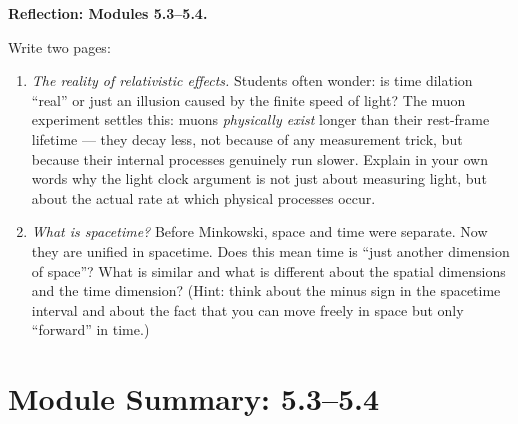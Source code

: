 \documentclass[12pt, a4paper, twoside]{book}
\begin{document}
\begin{reflectionbox}
\textbf{Reflection: Modules 5.3--5.4.}

Write two pages:

\begin{enumerate}[leftmargin=2em,itemsep=6pt]
  \item \textit{The reality of relativistic effects.} Students often wonder: is time dilation ``real'' or just an illusion caused by the finite speed of light? The muon experiment settles this: muons \textit{physically exist} longer than their rest-frame lifetime --- they decay less, not because of any measurement trick, but because their internal processes genuinely run slower. Explain in your own words why the light clock argument is not just about measuring light, but about the actual rate at which physical processes occur.

  \item \textit{What is spacetime?} Before Minkowski, space and time were separate. Now they are unified in spacetime. Does this mean time is ``just another dimension of space''? What is similar and what is different about the spatial dimensions and the time dimension? (Hint: think about the minus sign in the spacetime interval and about the fact that you can move freely in space but only ``forward'' in time.)
\end{enumerate}
\end{reflectionbox}

\chapter*{Module Summary: 5.3--5.4}
\end{document}
